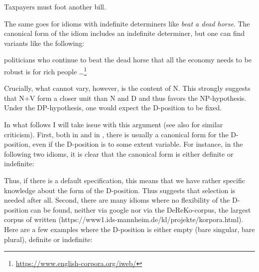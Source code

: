 \documentclass[output=paper,colorlinks,citecolor=black,
]{langscibook}
\begin{document}
\largerpage
 \ea Taxpayers must foot another bill.
 \z
 
\noindent
 The same goes for idioms with indefinite determiners like \emph{beat a dead horse}. The canonical form of the idiom includes an indefinite determiner, but one can find variants like the following:
 
 \ea politicians who continue to beat the dead horse that all the economy needs to be robust is for rich people \ldots\footnote{
\url{https://www.english-corpora.org/iweb/}}
 \z

\noindent
Crucially, what cannot vary, however, is the content of N. This strongly suggests that N+V form a closer unit than N and D and thus favors the NP-hypothesis. Under the DP-hypothesis, one would expect the D-position to be fixed.
 
 In what follows I will take issue with this argument (see also \citealt{Larson:to-appear:DP-hypothesisDP-CP} for similar criticism). First, both in  and in , there is usually a canonical form for the D-position, even if the D-position is to some extent variable. For instance, in the following two  idioms, it is clear that the canonical form is either definite or indefinite:

 \ea
    \z
    \z
    
\noindent
Thus, if there is a default specification, this means that   we have rather specific knowledge about the form of the D-position. Thus suggests that selection is needed after all. Second, there are many idioms where no flexibility of the D-position can be found, neither via google nor via the DeReKo-corpus, the largest corpus of written  (https://www1.ids-mannheim.de/kl/projekte/korpora.html). Here are a few  examples where the D-position is either empty (bare singular, bare plural), definite or indefinite:
    
    \ea
    \z
    \z
   
\end{document}
